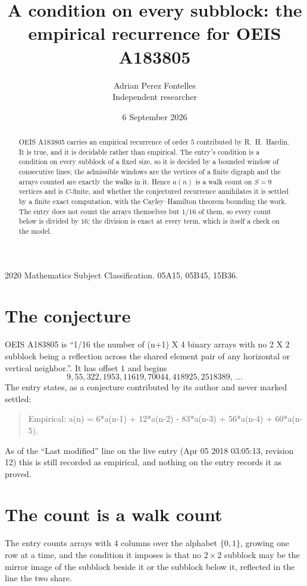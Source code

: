 \documentclass[11pt,a4paper]{article}
\title{A condition on every subblock: the empirical recurrence for OEIS A183805}
\author{Adrian Perez Fontelles\\ \small Independent researcher}
\date{6 September 2026}
\theoremstyle{plain}
\theoremstyle{definition}
\begin{document}
\maketitle

\begin{abstract}
OEIS A183805 carries an empirical recurrence of order $5$ contributed by R.~H.~Hardin. It is
true, and it is decidable rather than empirical. The entry's condition is a condition on every
subblock of a fixed size, so it is decided by a bounded window of consecutive lines; the
admissible windows are the vertices of a finite digraph and the arrays counted are exactly the
walks in it. Hence $a(n)$ is a walk count on $S=9$ vertices and is $C$-finite, and whether the
conjectured recurrence annihilates it is settled by a finite exact computation, with the
Cayley--Hamilton theorem bounding the work. The entry does not count the arrays themselves but $1/16$ of them, so every count below is divided by $16$; the division is exact at every term, which is itself a check on the model.
\end{abstract}

\noindent\small 2020 Mathematics Subject Classification. 05A15, 05B45, 15B36.\normalsize

\section{The conjecture}

OEIS A183805 is ``1/16 the number of (n+1) X 4 binary arrays with no 2 X 2 subblock being a reflection across the shared element pair of any horizontal or vertical neighbor.''. It has offset $1$ and begins
\[
9, 55, 322, 1953, 11619, 70044, 418925, 2518389,\ \dots
\]
The entry states, as a conjecture contributed by its author and never marked settled:
\begin{quote}
Empirical: a(n) = 6*a(n-1) + 12*a(n-2) - 83*a(n-3) + 56*a(n-4) + 60*a(n-5).
\end{quote}
As of the ``Last modified'' line on the live entry (Apr 05 2018 03:05:13, revision 12) this is still
recorded as empirical, and nothing on the entry records it as proved.

\section{The count is a walk count}

The entry counts arrays with $4$ columns over the alphabet $\{0,1\}$, growing one row at a time, and the condition it imposes is that no $2\times2$ subblock may be the mirror image of the subblock beside it or the subblock below it, reflected in the line the two share.
\end{document}
